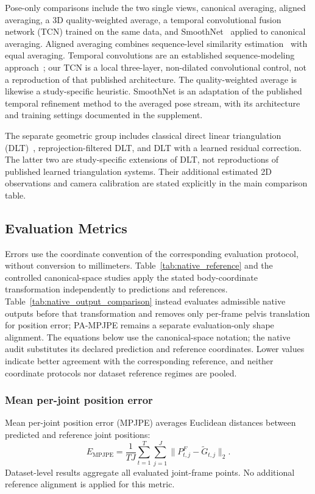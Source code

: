 \documentclass[preprint,12pt]{elsarticle}
\begin{document}
Pose-only comparisons include the two single views, canonical averaging, aligned averaging, a 3D quality-weighted average, a temporal convolutional fusion network (TCN) trained on the same data, and SmoothNet~\cite{zeng2022smoothnet} applied to canonical averaging. Aligned averaging combines sequence-level similarity estimation~\cite{umeyama1991least} with equal averaging. Temporal convolutions are an established sequence-modeling approach~\cite{bai2018empirical}; our TCN is a local three-layer, non-dilated convolutional control, not a reproduction of that published architecture. The quality-weighted average is likewise a study-specific heuristic. SmoothNet is an adaptation of the published temporal refinement method to the averaged pose stream, with its architecture and training settings documented in the supplement.

The separate geometric group includes classical direct linear triangulation (DLT)~\cite{hartley2004multiple}, reprojection-filtered DLT, and DLT with a learned residual correction. The latter two are study-specific extensions of DLT, not reproductions of published learned triangulation systems. Their additional estimated 2D observations and camera calibration are stated explicitly in the main comparison table.

\subsection{Evaluation Metrics}

Errors use the coordinate convention of the corresponding evaluation protocol, without conversion to millimeters. Table~\ref{tab:native_reference} and the controlled canonical-space studies apply the stated body-coordinate transformation independently to predictions and references. Table~\ref{tab:native_output_comparison} instead evaluates admissible native outputs before that transformation and removes only per-frame pelvis translation for position error; PA-MPJPE remains a separate evaluation-only shape alignment. The equations below use the canonical-space notation; the native audit substitutes its declared prediction and reference coordinates. Lower values indicate better agreement with the corresponding reference, and neither coordinate protocols nor dataset reference regimes are pooled.

\subsubsection{Mean per-joint position error}
Mean per-joint position error (MPJPE) averages Euclidean distances between predicted and reference joint positions:
\[
E_{\mathrm{MPJPE}}=\frac{1}{TJ}\sum_{t=1}^{T}\sum_{j=1}^{J}\|P^F_{t,j}-\tilde{G}_{t,j}\|_2.
\]
Dataset-level results aggregate all evaluated joint-frame points. No additional reference alignment is applied for this metric.
\end{document}
